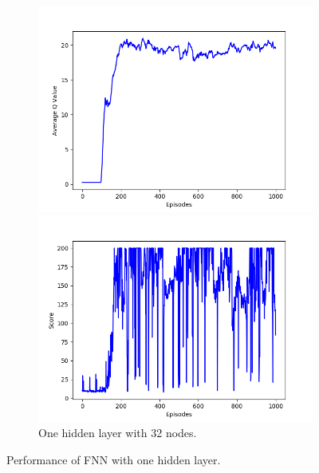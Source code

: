\documentclass{article}
\begin{document}
\begin{figure}[!htbp]
  \begin{subfigure}{\textwidth}
    \begin{minipage}{0.5\textwidth}
      \centering
      \includegraphics[scale=0.45]{../experiments/nn_size_32/qvalues.png}
    \end{minipage}
    \begin{minipage}{0.5\textwidth}
      \centering
      \includegraphics[scale=0.45]{../experiments/nn_size_32/scores.png}
    \end{minipage}
    \caption{One hidden layer with 32 nodes.}
  \end{subfigure}%
  \caption{Performance of FNN with one hidden layer.}
  \label{1 layer FNN}
\end{figure}
\end{document}
